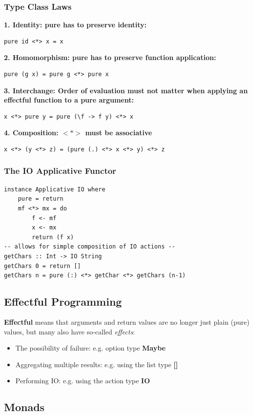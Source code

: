 \subsubsection{Type Class Laws}
\textbf{1. Identity: pure has to preserve identity:}
\begin{lstlisting}
pure id <*> x = x
\end{lstlisting}
\textbf{2. Homomorphism: pure has to preserve function application:}
\begin{lstlisting}
pure (g x) = pure g <*> pure x
\end{lstlisting} 
\textbf{3. Interchange: Order of evaluation must not matter when applying an effectful function to a pure argument:}
\begin{lstlisting}
x <*> pure y = pure (\f -> f y) <*> x
\end{lstlisting}
\textbf{4. Composition: $<*>$ must be associative}
\begin{lstlisting}
x <*> (y <*> z) = (pure (.) <*> x <*> y) <*> z
\end{lstlisting}

\subsubsection{The IO Applicative Functor}
\begin{lstlisting}
instance Applicative IO where 
    pure = return
    mf <*> mx = do 
        f <- mf 
        x <- mx
        return (f x)
-- allows for simple composition of IO actions --
getChars :: Int -> IO String 
getChars 0 = return []
getChars n = pure (:) <*> getChar <*> getChars (n-1)
\end{lstlisting}

\subsection{Effectful Programming}
\textbf{Effectful} means that arguments and return values are no longer just plain (pure) values, but many also have so-called \textit{effects}:
\begin{itemize}
    \item The possibility of failure: e.g. option type \textbf{Maybe}
    \item Aggregating multiple results: e.g. using the list type \textbf{[]}
    \item Performing IO: e.g. using the action type \textbf{IO}
\end{itemize}

\subsection{Monads}
